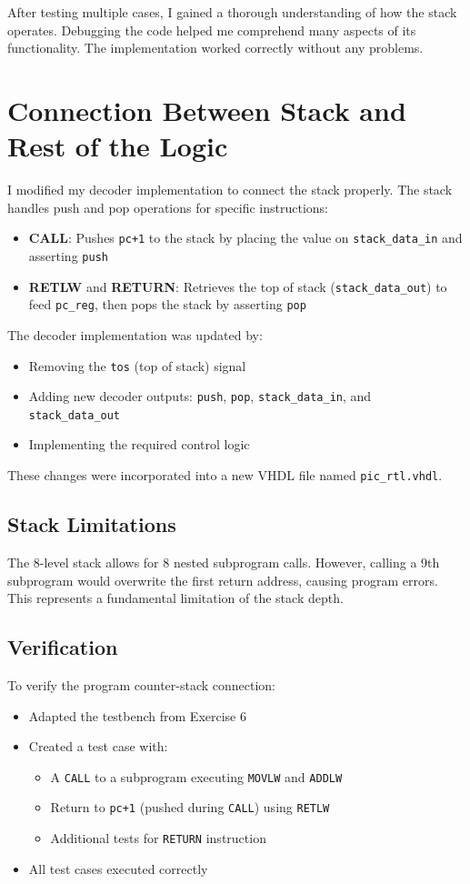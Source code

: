 After testing multiple cases, I gained a thorough understanding of how the stack operates. Debugging the code helped me comprehend many aspects of its functionality. The implementation worked correctly without any problems.

\section{Connection Between Stack and Rest of the Logic}
I modified my decoder implementation to connect the stack properly. The stack handles push and pop operations for specific instructions:
\begin{itemize}
    \item \textbf{CALL}: Pushes \texttt{pc+1} to the stack by placing the value on \texttt{stack\_data\_in} and asserting \texttt{push}
    \item \textbf{RETLW} and \textbf{RETURN}: Retrieves the top of stack (\texttt{stack\_data\_out}) to feed \texttt{pc\_reg}, then pops the stack by asserting \texttt{pop}
\end{itemize}

The decoder implementation was updated by:
\begin{itemize}
    \item Removing the \texttt{tos} (top of stack) signal
    \item Adding new decoder outputs: \texttt{push}, \texttt{pop}, \texttt{stack\_data\_in}, and \texttt{stack\_data\_out}
    \item Implementing the required control logic
\end{itemize}

These changes were incorporated into a new VHDL file named \texttt{pic\_rtl.vhdl}.

\subsection{Stack Limitations}
The 8-level stack allows for 8 nested subprogram calls. However, calling a 9th subprogram would overwrite the first return address, causing program errors. This represents a fundamental limitation of the stack depth.

\subsection{Verification}
To verify the program counter-stack connection:
\begin{itemize}
    \item Adapted the testbench from Exercise 6
    \item Created a test case with:
    \begin{itemize}
        \item A \texttt{CALL} to a subprogram executing \texttt{MOVLW} and \texttt{ADDLW}
        \item Return to \texttt{pc+1} (pushed during \texttt{CALL}) using \texttt{RETLW}
        \item Additional tests for \texttt{RETURN} instruction
    \end{itemize}
    \item All test cases executed correctly
\end{itemize}

